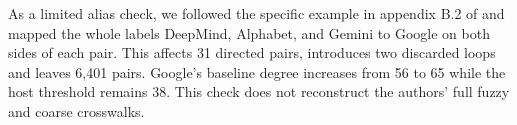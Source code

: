 As a limited alias check, we followed the specific example in appendix B.2 of \cite{cen} and mapped the whole labels DeepMind, Alphabet, and Gemini to Google on both sides of each pair. This affects 31 directed pairs, introduces two discarded loops and leaves 6,401 pairs. Google's baseline degree increases from 56 to 65 while the host threshold remains 38. This check does not reconstruct the authors' full fuzzy and coarse crosswalks.
